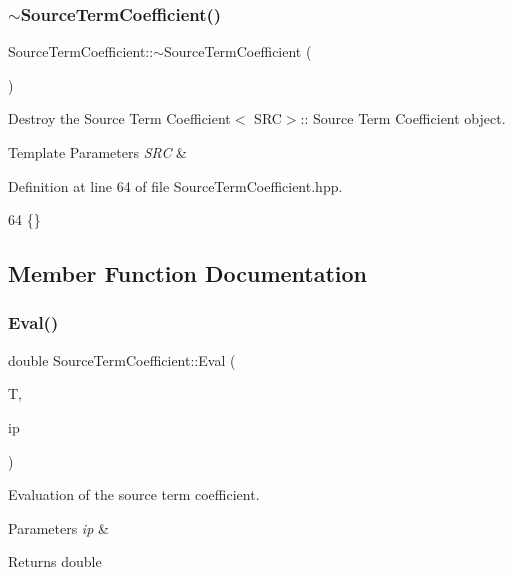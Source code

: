\subsubsection{\texorpdfstring{$\sim$\+Source\+Term\+Coefficient()}{~SourceTermCoefficient()}}
{\footnotesize\ttfamily Source\+Term\+Coefficient\+::$\sim$\+Source\+Term\+Coefficient (\begin{DoxyParamCaption}{ }\end{DoxyParamCaption})}



Destroy the Source Term Coefficient$<$ S\+R\+C$>$\+:\+: Source Term Coefficient object. 


\begin{DoxyTemplParams}{Template Parameters}
{\em S\+RC} & \\
\hline
\end{DoxyTemplParams}


Definition at line 64 of file Source\+Term\+Coefficient.\+hpp.


\begin{DoxyCode}
64 \{\}
\end{DoxyCode}


\subsection{Member Function Documentation}
\mbox{\label{classSourceTermCoefficient_a194d078c44616aff71a9266dfe988efc}} 
\subsubsection{\texorpdfstring{Eval()}{Eval()}}
{\footnotesize\ttfamily double Source\+Term\+Coefficient\+::\+Eval (\begin{DoxyParamCaption}\item[{mfem\+::\+Element\+Transformation \&}]{T,  }\item[{const mfem\+::\+Integration\+Point \&}]{ip }\end{DoxyParamCaption})}



Evaluation of the source term coefficient. 


\begin{DoxyParams}{Parameters}
{\em ip} & \\
\hline
\end{DoxyParams}
\begin{DoxyReturn}{Returns}
double 
\end{DoxyReturn}


